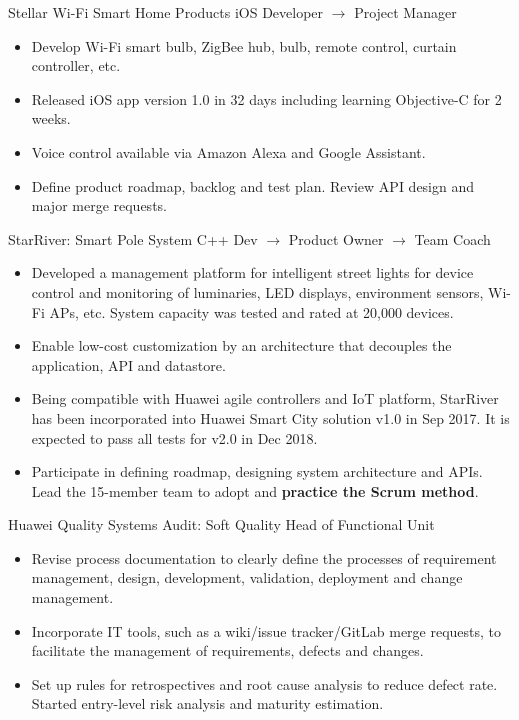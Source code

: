 \documentclass[11pt,a4paper]{moderncv}
\begin{document}
{Stellar Wi-Fi Smart Home Products}
{iOS Developer $\rightarrow$ Project Manager}
{}{}
{
\begin{itemize}
	\item Develop Wi-Fi smart bulb, ZigBee hub, bulb, remote control, curtain controller, etc.
	\item Released  iOS app version 1.0 in 32 days including learning Objective-C for 2 weeks.
	\item Voice control available via Amazon Alexa and Google Assistant.
	\item Define product roadmap, backlog and test plan. Review API design and major merge requests.
\end{itemize}
}

{StarRiver: Smart Pole System}
{C++ Dev $\rightarrow$ Product Owner $\rightarrow$ Team Coach}
{}{}
{
\begin{itemize}
	\item Developed a management platform for intelligent street lights for device control and monitoring of luminaries, LED displays, environment sensors, Wi-Fi APs, etc. System capacity was tested and rated at 20,000 devices.
	\item Enable low-cost customization by an architecture that decouples the application, API and datastore.
	\item Being compatible with Huawei agile controllers and IoT platform, StarRiver has been incorporated into Huawei Smart City solution v1.0 in Sep 2017. It is expected to pass all tests for v2.0 in Dec 2018.
	\item Participate in defining roadmap, designing system architecture and APIs. Lead the 15-member team to adopt and \textbf{practice the Scrum method}.
\end{itemize}
}

{Huawei Quality Systems Audit: Soft Quality}
{Head of Functional Unit}
{}{}
{
\begin{itemize}
	\item Revise process documentation to clearly define the processes of requirement management, design, development, validation, deployment and change management.
	\item Incorporate IT tools, such as a wiki/issue tracker/GitLab merge requests, to facilitate the management of requirements, defects and changes.
	\item Set up rules for retrospectives and root cause analysis to reduce defect rate. Started entry-level risk analysis and maturity estimation.
\end{itemize}
}
\end{document}
